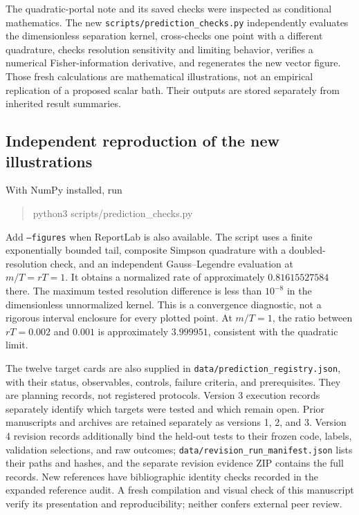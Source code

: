 The quadratic-portal note and its saved checks were inspected as conditional mathematics. The new \texttt{scripts/prediction\_checks.py} independently evaluates the dimensionless separation kernel, cross-checks one point with a different quadrature, checks resolution sensitivity and limiting behavior, verifies a numerical Fisher-information derivative, and regenerates the new vector figure. Those fresh calculations are mathematical illustrations, not an empirical replication of a proposed scalar bath. Their outputs are stored separately from inherited result summaries.

\subsection{Independent reproduction of the new illustrations}
With NumPy installed, run
\begin{quote}\ttfamily
python3 scripts/prediction\_checks.py
\end{quote}
Add \texttt{--figures} when ReportLab is also available. The script uses a finite exponentially bounded tail, composite Simpson quadrature with a doubled-resolution check, and an independent Gauss--Legendre evaluation at $m/T=rT=1$. It obtains a normalized rate of approximately $0.81615527584$ there. The maximum tested resolution difference is less than $10^{-8}$ in the dimensionless unnormalized kernel. This is a convergence diagnostic, not a rigorous interval enclosure for every plotted point. At $m/T=1$, the ratio between $rT=0.002$ and $0.001$ is approximately $3.999951$, consistent with the quadratic limit.

The twelve target cards are also supplied in \texttt{data/prediction\_registry.json}, with their status, observables, controls, failure criteria, and prerequisites. They are planning records, not registered protocols. Version 3 execution records separately identify which targets were tested and which remain open. Prior manuscripts and archives are retained separately as versions 1, 2, and 3. Version 4 revision records additionally bind the held-out tests to their frozen code, labels, validation selections, and raw outcomes; \texttt{data/revision\_run\_manifest.json} lists their paths and hashes, and the separate revision evidence ZIP contains the full records. New references have bibliographic identity checks recorded in the expanded reference audit. A fresh compilation and visual check of this manuscript verify its presentation and reproducibility; neither confers external peer review.

